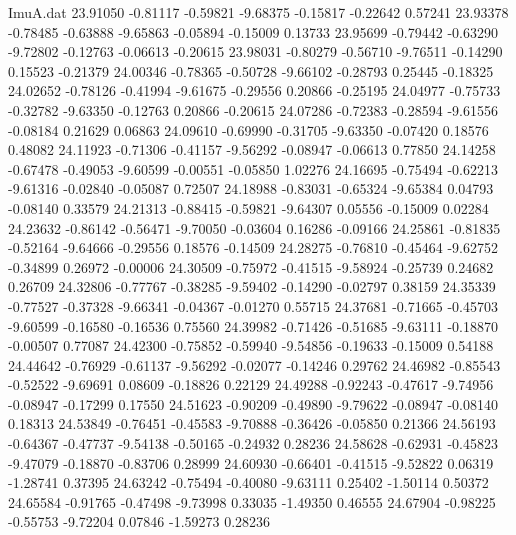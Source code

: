 \begin{filecontents}{ImuA.dat}
  23.91050   -0.81117   -0.59821   -9.68375   -0.15817   -0.22642    0.57241
  23.93378   -0.78485   -0.63888   -9.65863   -0.05894   -0.15009    0.13733
  23.95699   -0.79442   -0.63290   -9.72802   -0.12763   -0.06613   -0.20615
  23.98031   -0.80279   -0.56710   -9.76511   -0.14290    0.15523   -0.21379
  24.00346   -0.78365   -0.50728   -9.66102   -0.28793    0.25445   -0.18325
  24.02652   -0.78126   -0.41994   -9.61675   -0.29556    0.20866   -0.25195
  24.04977   -0.75733   -0.32782   -9.63350   -0.12763    0.20866   -0.20615
  24.07286   -0.72383   -0.28594   -9.61556   -0.08184    0.21629    0.06863
  24.09610   -0.69990   -0.31705   -9.63350   -0.07420    0.18576    0.48082
  24.11923   -0.71306   -0.41157   -9.56292   -0.08947   -0.06613    0.77850
  24.14258   -0.67478   -0.49053   -9.60599   -0.00551   -0.05850    1.02276
  24.16695   -0.75494   -0.62213   -9.61316   -0.02840   -0.05087    0.72507
  24.18988   -0.83031   -0.65324   -9.65384    0.04793   -0.08140    0.33579
  24.21313   -0.88415   -0.59821   -9.64307    0.05556   -0.15009    0.02284
  24.23632   -0.86142   -0.56471   -9.70050   -0.03604    0.16286   -0.09166
  24.25861   -0.81835   -0.52164   -9.64666   -0.29556    0.18576   -0.14509
  24.28275   -0.76810   -0.45464   -9.62752   -0.34899    0.26972   -0.00006
  24.30509   -0.75972   -0.41515   -9.58924   -0.25739    0.24682    0.26709
  24.32806   -0.77767   -0.38285   -9.59402   -0.14290   -0.02797    0.38159
  24.35339   -0.77527   -0.37328   -9.66341   -0.04367   -0.01270    0.55715
  24.37681   -0.71665   -0.45703   -9.60599   -0.16580   -0.16536    0.75560
  24.39982   -0.71426   -0.51685   -9.63111   -0.18870   -0.00507    0.77087
  24.42300   -0.75852   -0.59940   -9.54856   -0.19633   -0.15009    0.54188
  24.44642   -0.76929   -0.61137   -9.56292   -0.02077   -0.14246    0.29762
  24.46982   -0.85543   -0.52522   -9.69691    0.08609   -0.18826    0.22129
  24.49288   -0.92243   -0.47617   -9.74956   -0.08947   -0.17299    0.17550
  24.51623   -0.90209   -0.49890   -9.79622   -0.08947   -0.08140    0.18313
  24.53849   -0.76451   -0.45583   -9.70888   -0.36426   -0.05850    0.21366
  24.56193   -0.64367   -0.47737   -9.54138   -0.50165   -0.24932    0.28236
  24.58628   -0.62931   -0.45823   -9.47079   -0.18870   -0.83706    0.28999
  24.60930   -0.66401   -0.41515   -9.52822    0.06319   -1.28741    0.37395
  24.63242   -0.75494   -0.40080   -9.63111    0.25402   -1.50114    0.50372
  24.65584   -0.91765   -0.47498   -9.73998    0.33035   -1.49350    0.46555
  24.67904   -0.98225   -0.55753   -9.72204    0.07846   -1.59273    0.28236

\end{filecontents}
